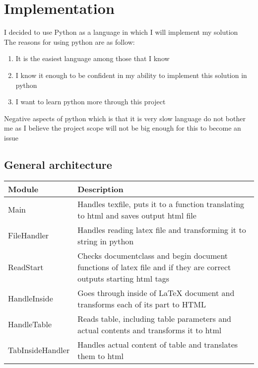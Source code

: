 \documentclass[12pt]{article}
\begin{document}
\section{Implementation}
I decided to use Python as a language in which I will implement my solution \\ 
The reasons for using python are as follow:
\begin{enumerate}
    \item It is the easiest language among those that I know
    \item I know it enough to be confident in my ability to implement this solution in python
    \item I want to learn python more through this project
\end{enumerate}
Negative aspects of python which is that it is very slow language do not bother me as I believe the project scope will not be big enough for this to become an issue
  
\subsection{General architecture}
\begin{tabular}{|l|p{10cm}|}
    \hline 
    Module & Description \\ 
    \hline 
    Main & Handles texfile, puts it to a function translating to html and saves output html file \\
    \hline
    FileHandler & Handles reading latex file and transforming it to string in python  \\ 
    \hline 
    ReadStart & Checks documentclass and begin document functions of latex file and if they are correct outputs starting html tags \\
    \hline
    HandleInside & Goes through inside of LaTeX document and transforms each of its part to HTML
    \\
    \hline
    HandleTable & Reads table, including table parameters and actual contents and transforms it to html \\ 
    \hline
    TabInsideHandler & Handles actual content of table and translates them to html \\
\end{tabular}
\end{document}
